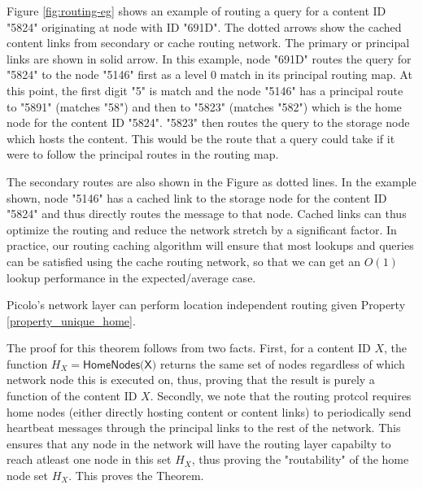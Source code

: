 Figure \ref{fig:routing-eg} shows an example of routing a query for a content ID "5824" originating at node with ID
"691D". The dotted arrows show the cached content links from secondary or cache routing network. The primary or
principal links are shown in solid arrow. In this example, node "691D" routes the query for "5824" to the node "5146"
first as a level 0 match in its principal routing map. At this point, the first digit "5" is match and the node "5146"
has a principal route to "5891" (matches "58") and then to "5823" (matches "582") which is the home node for the content
ID "5824". "5823" then routes the query to the storage node which hosts the content. This would be the route that a
query could take if it were to follow the principal routes in the routing map.

The secondary routes are also shown in the Figure as dotted lines. In the example shown, node "5146" has a cached link
to the storage node for the content ID "5824" and thus directly routes the message to that node. Cached links can thus
optimize the routing and reduce the network stretch by a significant factor.  In practice, our routing caching algorithm will
ensure that most lookups and queries can be satisfied using the cache routing network, so that we can get an \(O(1)\) lookup
performance in the expected/average case.


\begin{theorem}
\textsf{Picolo}'s network layer can perform location independent routing given Property \ref{property_unique_home}.
\end{theorem}

The proof for this theorem follows from two facts. First, for a content ID \(X\), the function \(H_X = \textsf{HomeNodes(X)}\) returns
the same set of nodes regardless of which network node this is executed on, thus, proving that the result is purely a function
of the content ID \(X\). Secondly, we note that the routing protcol requires home nodes (either directly hosting content or content links)
to periodically send heartbeat messages through the principal links to the rest of the network. This ensures that any node in the 
network will have the routing layer capabilty to reach atleast one node in this set \(H_X\), thus proving the
"routability" of the home node set \(H_X\). This proves the Theorem. 

